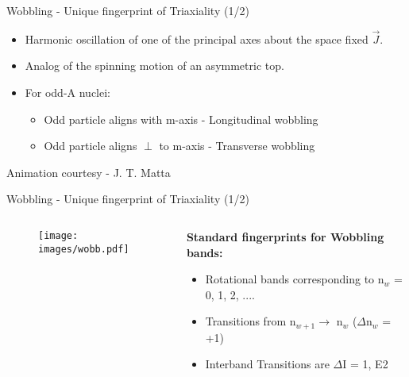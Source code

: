\documentclass [aspectratio=169]{beamer}
\begin{document}
\begin{frame}{Wobbling - Unique fingerprint of Triaxiality (1/2)}
\begin{multicols}{2}
\begin{itemize}
\item {Harmonic oscillation of one of the principal axes about the space fixed \textbf{$\vec{J}$}.}
\item {Analog of the spinning motion of an asymmetric top.}
\item {For odd-A nuclei:}
\begin{itemize}
\item{Odd particle aligns with m-axis - Longitudinal wobbling}
\item{Odd particle aligns $\perp$ to m-axis - Transverse wobbling}
\end{itemize}
\end{itemize}
\begin{center}
\begin{figure}
\end{figure}
\scriptsize{\color{violet} Animation courtesy - J. T. Matta} 
\end{center}
\end{multicols}
\end{frame}

\begin{frame}{Wobbling - Unique fingerprint of Triaxiality (1/2)}
\begin{columns}[c]
\begin{column}{0.5\textwidth}
\begin{center}
\begin{figure}
\texttt{[image: images/wobb.pdf]}
\end{figure}
\end{center}
\end{column}
\begin{column}{0.5\textwidth}
\textbf{Standard fingerprints for Wobbling bands:}
\begin{itemize}
\item{Rotational bands corresponding to n$_{w}$ = 0, 1, 2, ....}
\item{Transitions from n$_{w+1} \rightarrow$ n$_{w}$ ($\Delta$n$_{w}$ = +1)}
\item{Interband Transitions are $\Delta\mathrm{I}$ = 1, E2}
\end{itemize}
\end{column}
\end{columns}
\end{frame}
\end{document}
